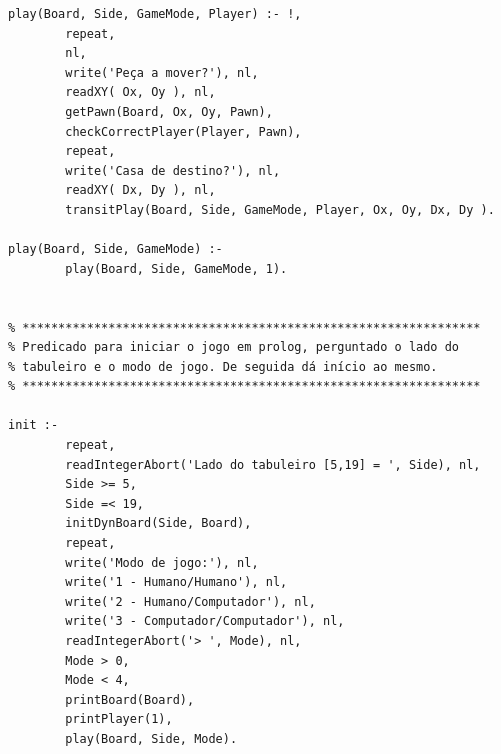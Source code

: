 \documentclass[15pt,a4paper]{article}
\begin{document}
\begin{lstlisting}
play(Board, Side, GameMode, Player) :- !,
		repeat,
		nl,
		write('Peça a mover?'), nl,
		readXY( Ox, Oy ), nl,
		getPawn(Board, Ox, Oy, Pawn),
		checkCorrectPlayer(Player, Pawn),
		repeat,
		write('Casa de destino?'), nl,	
		readXY( Dx, Dy ), nl,
		transitPlay(Board, Side, GameMode, Player, Ox, Oy, Dx, Dy ).
	
play(Board, Side, GameMode) :-
		play(Board, Side, GameMode, 1).


% ****************************************************************
% Predicado para iniciar o jogo em prolog, perguntado o lado do
% tabuleiro e o modo de jogo. De seguida dá início ao mesmo.
% ****************************************************************
	
init :-
		repeat,
		readIntegerAbort('Lado do tabuleiro [5,19] = ', Side), nl,
		Side >= 5,
		Side =< 19,
		initDynBoard(Side, Board),
		repeat,
		write('Modo de jogo:'), nl,
		write('1 - Humano/Humano'), nl,
		write('2 - Humano/Computador'), nl,
		write('3 - Computador/Computador'), nl,
		readIntegerAbort('> ', Mode), nl,
		Mode > 0,
		Mode < 4,
		printBoard(Board),
		printPlayer(1),
		play(Board, Side, Mode).

\end{lstlisting}
\end{document}
